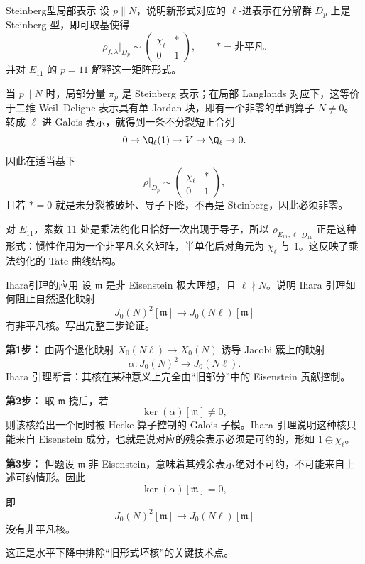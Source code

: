 \begin{problem}{Steinberg型局部表示}
设 $p\parallel N$，说明新形式对应的 $\ell$-进表示在分解群 $D_p$ 上是 Steinberg 型，即可取基使得
\[
\rho_{f,\lambda}|_{D_p}\sim
\begin{pmatrix}
\chi_\ell & *\\
0&1
\end{pmatrix},
\qquad *=\text{非平凡}.
\]
并对 $E_{11}$ 的 $p=11$ 解释这一矩阵形式。
\end{problem}
\begin{solution}
当 $p\parallel N$ 时，局部分量 $\pi_p$ 是 Steinberg 表示；在局部 Langlands 对应下，这等价于二维 Weil--Deligne 表示具有单 Jordan 块，即有一个非零的单调算子 $N\neq0$。转成 $\ell$-进 Galois 表示，就得到一条不分裂短正合列
\[
0\to \Q_\ell(1)\to V\to \Q_\ell\to0.
\]
因此在适当基下
\[
\rho|_{D_p}\sim
\begin{pmatrix}
\chi_\ell & *\\0&1
\end{pmatrix},
\]
且若 $*=0$ 就是未分裂被破坏、导子下降，不再是 Steinberg，因此必须非零。

对 $E_{11}$，素数 $11$ 处是乘法约化且恰好一次出现于导子，所以 $\rho_{E_{11},\ell}|_{D_{11}}$ 正是这种形式：惯性作用为一个非平凡幺幺矩阵，半单化后对角元为 $\chi_\ell$ 与 $1$。这反映了乘法约化的 Tate 曲线结构。
\end{solution}

\begin{problem}{Ihara引理的应用}
设 $\mathfrak m$ 是非 Eisenstein 极大理想，且 $\ell\nmid N$。说明 Ihara 引理如何阻止自然退化映射
\[
J_0(N)^2[\mathfrak m]\longrightarrow J_0(N\ell)[\mathfrak m]
\]
有非平凡核。写出完整三步论证。
\end{problem}
\begin{solution}
\textbf{第1步：} 由两个退化映射 $X_0(N\ell)\to X_0(N)$ 诱导 Jacobi 簇上的映射
\[
\alpha:J_0(N)^2\to J_0(N\ell).
\]
Ihara 引理断言：其核在某种意义上完全由“旧部分”中的 Eisenstein 贡献控制。

\textbf{第2步：} 取 $\mathfrak m$-挠后，若
\[
\ker(\alpha)[\mathfrak m]\neq0,
\]
则该核给出一个同时被 Hecke 算子控制的 Galois 子模。Ihara 引理说明这种核只能来自 Eisenstein 成分，也就是说对应的残余表示必须是可约的，形如 $1\oplus\chi_\ell$。

\textbf{第3步：} 但题设 $\mathfrak m$ 非 Eisenstein，意味着其残余表示绝对不可约，不可能来自上述可约情形。因此
\[
\ker(\alpha)[\mathfrak m]=0,
\]
即
\[
J_0(N)^2[\mathfrak m]\to J_0(N\ell)[\mathfrak m]
\]
没有非平凡核。

这正是水平下降中排除“旧形式坏核”的关键技术点。
\end{solution}

